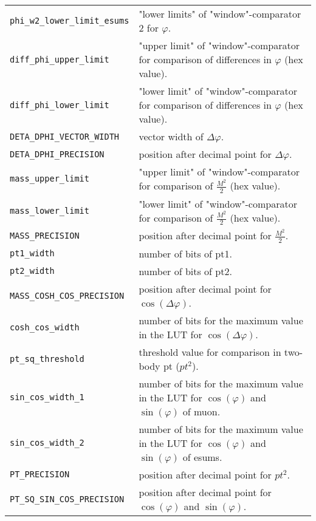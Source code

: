 \begin{longtable}{>{\footnotesize}l >{\footnotesize}p{}}
\verb|phi_w2_lower_limit_esums| & "lower limits" of "window"-comparator 2 for $\varphi$.\\
\verb|diff_phi_upper_limit| & "upper limit" of "window"-comparator for comparison of differences in $\varphi$ (hex value).\\
\verb|diff_phi_lower_limit| & "lower limit" of "window"-comparator for comparison of differences in $\varphi$ (hex value).\\
\verb|DETA_DPHI_VECTOR_WIDTH| & vector width of $\Delta\varphi$.\\
\verb|DETA_DPHI_PRECISION| & position after decimal point for $\Delta\varphi$.\\
\verb|mass_upper_limit| & "upper limit" of "window"-comparator for comparison of $\frac{M^2}{2}$ (hex value).\\
\verb|mass_lower_limit| & "lower limit" of "window"-comparator for comparison of $\frac{M^2}{2}$ (hex value).\\
\verb|MASS_PRECISION| & position after decimal point for $\frac{M^2}{2}$.\\
\verb|pt1_width| & number of bits of pt1.\\
\verb|pt2_width| & number of bits of pt2.\\
\verb|MASS_COSH_COS_PRECISION| & position after decimal point for $\cos(\Delta\varphi)$.\\
\verb|cosh_cos_width| & number of bits for the maximum value in the LUT for $\cos(\Delta\varphi)$.\\
\verb|pt_sq_threshold| & threshold value for comparison in two-body pt (${pt^2}$).\\
\verb|sin_cos_width_1| & number of bits for the maximum value in the LUT for $\cos(\varphi)$ and $\sin(\varphi)$ of muon.\\
\verb|sin_cos_width_2| & number of bits for the maximum value in the LUT for $\cos(\varphi)$ and $\sin(\varphi)$ of esums.\\
\verb|PT_PRECISION| & position after decimal point for ${pt^2}$.\\
\verb|PT_SQ_SIN_COS_PRECISION| & position after decimal point for $\cos(\varphi)$ and $\sin(\varphi)$.\\


\end{longtable}
